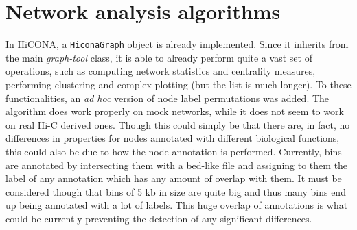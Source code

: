 
\section{Network analysis algorithms}

In HiCONA, a \texttt{HiconaGraph} object is already implemented. Since it inherits from the main \textit{graph-tool} class, it is able to already perform quite a vast set of operations, such as computing network statistics and centrality measures, performing clustering and complex plotting (but the list is much longer). To these functionalities, an \textit{ad hoc} version of node label permutations was added. The algorithm does work properly on mock networks, while it does not seem to work on real Hi-C derived ones. Though this could simply be that there are, in fact, no differences in properties for nodes annotated with different biological functions, this could also be due to how the node annotation is performed. Currently, bins are annotated by intersecting them with a bed-like file and assigning to them the label of any annotation which has any amount of overlap with them. It must be considered though that bins of 5 kb in size are quite big and thus many bins end up being annotated with a lot of labels. This huge overlap of annotations is what could be currently preventing the detection of any significant differences.

